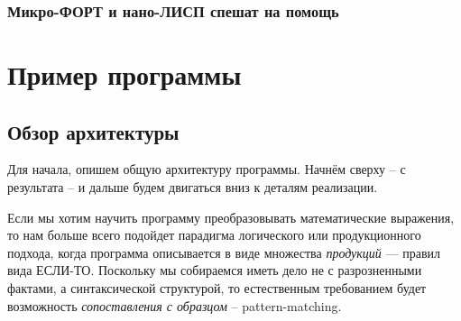 \documentclass[10pt]{report}
\begin{document}
\subsection{Микро-ФОРТ и нано-ЛИСП спешат на помощь}
\chapter{Пример программы}
\minitoc
\section{Обзор архитектуры}
Для начала, опишем общую архитектуру программы.
Начнём сверху -- с результата -- и дальше будем двигаться вниз к деталям реализации.

Если мы хотим научить программу преобразовывать математические выражения, то нам больше всего подойдет парадигма логического или продукционного подхода, когда программа описывается в виде множества {\em продукций} --- правил вида ЕСЛИ-ТО. 
Поскольку мы собираемся иметь дело не с разрозненными фактами, а синтаксической структурой, то естественным требованием будет возможность {\em сопоставления с образцом} -- pattern-matching. 
\end{document}

